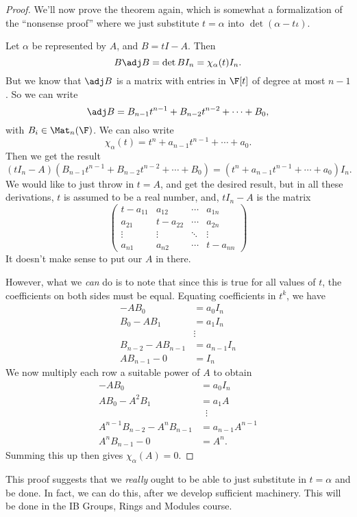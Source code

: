 \documentclass[a4paper]{article}
\begin{document}
\begin{proof}
  We'll now prove the theorem again, which is somewhat a formalization of the ``nonsense proof'' where we just substitute $t = \alpha$ into $\det (\alpha - t\iota)$.

  Let $\alpha$ be represented by $A$, and $B = tI - A$. Then
  \[
    B\adj B = \det B I_n = \chi_\alpha(t) I_n.
  \]
  But we know that $\adj B$ is a matrix with entries in $\F[t]$ of degree at most $n - 1$. So we can write
  \[
    \adj B = B_{n - 1}t^{n - 1} + B_{n - 2}t^{n - 2} + \cdots + B_0,
  \]
  with $B_i \in \Mat_n (\F)$. We can also write
  \[
    \chi_\alpha(t) = t^n + a_{n - 1}t^{n - 1} + \cdots + a_0.
  \]
  Then we get the result
  \[
    (tI_n - A) (B_{n - 1}t^{n - 1} + B_{n - 2} t^{n - 2} + \cdots + B_0) = (t^n + a_{n - 1} t^{n - 1} + \cdots + a_0)I_n.
  \]
  We would like to just throw in $t = A$, and get the desired result, but in all these derivations, $t$ is assumed to be a real number, and, $tI_n - A$ is the matrix
  \[
    \begin{pmatrix}
      t - a_{11} & a_{12} & \cdots & a_{1n}\\
      a_{21} & t - a_{22} & \cdots & a_{2n}\\
      \vdots & \vdots & \ddots & \vdots\\
      a_{n1} & a_{n2} & \cdots & t - a_{nn}
    \end{pmatrix}
  \]
  It doesn't make sense to put our $A$ in there.

  However, what we \emph{can} do is to note that since this is true for all values of $t$, the coefficients on both sides must be equal. Equating coefficients in $t^k$, we have
  \begin{align*}
    -A B_0 &= a_0I_n\\
    B_0 - AB_1 &= a_1I_n\\
    &\vdots\\
    B_{n - 2} - AB_{n - 1} &= a_{n - 1}I_n\\
    AB_{n - 1} - 0 &= I_n
  \end{align*}
  We now multiply each row a suitable power of $A$ to obtain
  \begin{align*}
    -A B_0 &= a_0 I_n\\
    A B_0 - A^2B_1 &= a_1 A\\
    &\;\;\vdots\\
    A^{n - 1}B_{n - 2} - A^n B_{n - 1} &= a_{n - 1} A^{n - 1}\\
    A^{n}B_{n - 1} - 0 &= A^n.
  \end{align*}
  Summing this up then gives $\chi_\alpha(A) = 0$.
\end{proof}
This proof suggests that we \emph{really} ought to be able to just substitute in $t = \alpha$ and be done. In fact, we can do this, after we develop sufficient machinery. This will be done in the IB Groups, Rings and Modules course.
\end{document}
